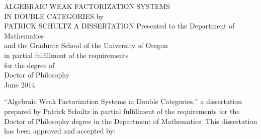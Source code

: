\documentclass[11pt,draft]{UOthesis}
\begin{document}

	\setlength{\parindent}{0in} 	



	
	\thispagestyle{empty}	%
	\vspace*{50pt}
	\begin{center} %
		ALGEBRAIC WEAK FACTORIZATION SYSTEMS\\
		IN DOUBLE CATEGORIES
	\vfill
		by	\\ %
		PATRICK SCHULTZ
	\vfill
		A DISSERTATION
	{\singlespace
		Presented to the Department of Mathematics\\
		and the Graduate School of the University of Oregon\\
		in partial fulfillment of the requirements\\
		for the degree of\\
		Doctor of Philosophy \\
		
		June 2014
		}%
	\end{center}



	\newpage
	\TOP

	``Algebraic Weak Factorization Systems in Double Categories,''
		a dissertation prepared by 
		Patrick Schultz %
	 	in partial fulfillment of the requirements for the
	 	Doctor of Philosophy 
	 	degree in the 
	 Department of Mathematics. 
		This dissertation has been approved and accepted by: \\[60pt]
\end{document}
